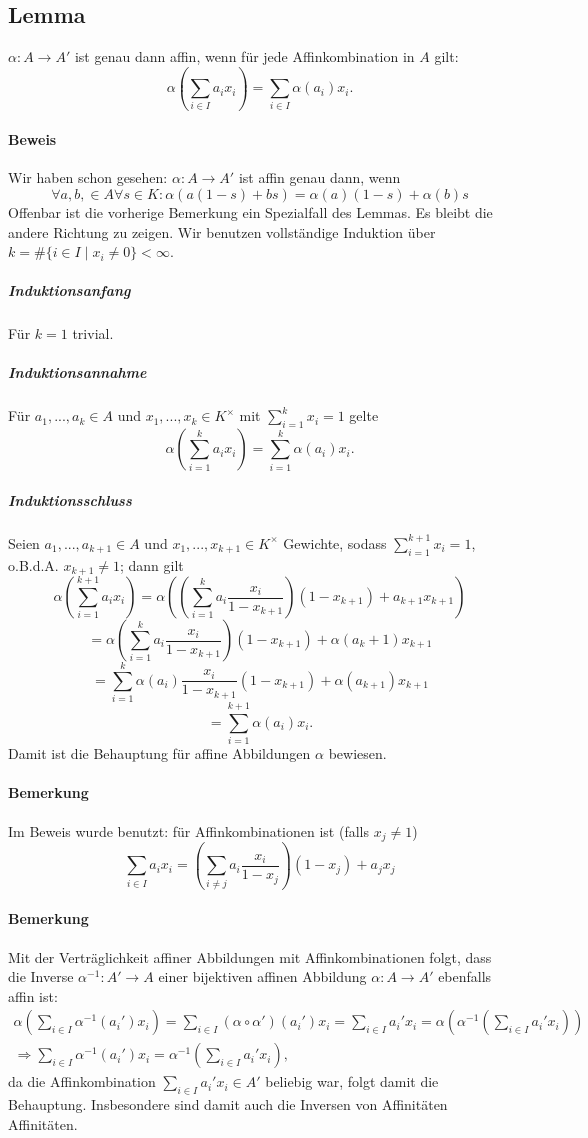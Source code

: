 \subsection{Lemma}
	\begin{Lemma}[]
		$ \alpha:A\to A' $ ist genau dann affin, wenn für jede Affinkombination in $ A $ gilt:
			\[ \alpha(\sum_{i\in I}a_ix_i) = \sum_{i\in I} \alpha(a_i)x_i. \]
	\end{Lemma}
	
\paragraph{Beweis}
	Wir haben schon gesehen: $ \alpha:A\to A' $ ist affin genau dann, wenn
		\[ \forall a,b,\in A\forall s\in K:\alpha(a(1-s)+bs) = \alpha(a)(1-s)+\alpha(b)s \]
	Offenbar ist die vorherige Bemerkung ein Spezialfall des Lemmas. Es bleibt die andere Richtung zu zeigen. Wir benutzen vollständige Induktion über $k = \#\{{i\in I}\mid x_i\neq 0\}<\infty $.
	
\subparagraph{Induktionsanfang}
	Für $ k=1 $ trivial.

\subparagraph{Induktionsannahme}
	Für $ a_1,...,a_k\in A $ und $ x_1,...,x_k \in K^\times$ mit $ \sum_{i=1}^{k}x_i=1 $ gelte
		\[ \alpha(\sum_{i=1}^{k}a_ix_i) = \sum_{i=1}^{k}\alpha(a_i)x_i. \]
	
\subparagraph{Induktionsschluss}
	Seien $ a_1,...,a_{k+1} \in A$ und $ x_1,...,x_{k+1} \in K^\times$ Gewichte, sodass $ \sum_{i=1}^{k+1}x_i = 1 $, o.B.d.A. $ x_{k+1}\neq 1 $; dann gilt
		\[ \alpha(\sum_{i=1}^{k+1}a_ix_i) = \alpha((\sum_{i=1}^{k}a_i\frac{x_i}{1-x_{k+1}})(1-x_{k+1})+a_{k+1}x_{k+1}) \]
		\[ = \alpha(\sum_{i=1}^{k}a_i\frac{x_i}{1-x_{k+1}})(1-x_{k+1})+\alpha(a_k+1)x_{k+1} \]
		\[ = \sum_{i=1}^{k}\alpha(a_i)\frac{x_i}{1-x_{k+1}}(1-x_{k+1})+\alpha(a_{k+1})x_{k+1} \]
		\[ = \sum_{i=1}^{k+1}\alpha(a_i)x_i. \]
	Damit ist die Behauptung für affine Abbildungen $ \alpha $ bewiesen.

\paragraph{Bemerkung}
	Im Beweis wurde benutzt: für Affinkombinationen ist (falls $ x_j \neq 1$)
		\[ \sum_{i\in I}a_ix_i = \left(\sum_{i\neq j}a_i\frac{x_i}{1-x_j}\right)(1-x_j)+a_jx_j \]
\paragraph{Bemerkung}
	Mit der Verträglichkeit affiner Abbildungen mit Affinkombinationen folgt, dass die Inverse $ \alpha^{-1}:A'\to A $ einer bijektiven affinen Abbildung $ \alpha:A\to A' $ ebenfalls affin ist:
		\begin{gather*}
		\alpha\left(\sum_{i\in I} \alpha^{-1}(a_i')x_i\right)=\sum_{i\in I}(\alpha\circ\alpha')(a_i')x_i = \sum_{i\in I}a_i'x_i = \alpha\left(\alpha^{-1}(\sum_{i\in I}a_i'x_i)\right) \\
		\Rightarrow \sum_{i\in I} \alpha^{-1}(a_i')x_i =\alpha^{-1}(\sum_{i\in I}a_i'x_i),
		\end{gather*}
	da die Affinkombination $ \sum_{i\in I}a_i'x_i\in A' $ beliebig war, folgt damit die Behauptung. Insbesondere sind damit auch die Inversen von Affinitäten Affinitäten.

